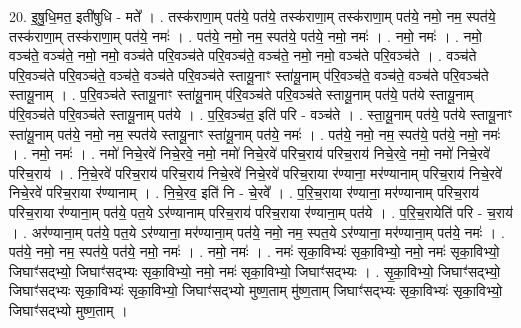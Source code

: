 \documentclass[17pt]{extarticle}
\begin{document}
20. इ॒षु॒धि॒मत॒ इती॑षुधि - मते᳚ । . तस्क॑राणा॒म् पत॑ये॒ पत॑ये॒ तस्क॑राणा॒म् तस्क॑राणा॒म् पत॑ये॒ नमो॒ नम॒ स्पत॑ये॒ तस्क॑राणा॒म् तस्क॑राणा॒म् पत॑ये॒ नमः॑ । . पत॑ये॒ नमो॒ नम॒ स्पत॑ये॒ पत॑ये॒ नमो॒ नमः॑ । . नमो॒ नमः॑ । . नमो॒ वञ्च॑ते॒ वञ्च॑ते॒ नमो॒ नमो॒ वञ्च॑ते परि॒वञ्च॑ते परि॒वञ्च॑ते॒ वञ्च॑ते॒ नमो॒ नमो॒ वञ्च॑ते परि॒वञ्च॑ते । . वञ्च॑ते परि॒वञ्च॑ते परि॒वञ्च॑ते॒ वञ्च॑ते॒ वञ्च॑ते परि॒वञ्च॑ते स्तायू॒नाꣳ स्ता॑यू॒नाम् प॑रि॒वञ्च॑ते॒ वञ्च॑ते॒ वञ्च॑ते परि॒वञ्च॑ते स्तायू॒नाम् । . प॒रि॒वञ्च॑ते स्तायू॒नाꣳ स्ता॑यू॒नाम् प॑रि॒वञ्च॑ते परि॒वञ्च॑ते स्तायू॒नाम् पत॑ये॒ पत॑ये स्तायू॒नाम् प॑रि॒वञ्च॑ते परि॒वञ्च॑ते स्तायू॒नाम् पत॑ये । . प॒रि॒वञ्च॑त॒ इति॑ परि - वञ्च॑ते । . स्ता॒यू॒नाम् पत॑ये॒ पत॑ये स्तायू॒नाꣳ स्ता॑यू॒नाम् पत॑ये॒ नमो॒ नम॒ स्पत॑ये स्तायू॒नाꣳ स्ता॑यू॒नाम् पत॑ये॒ नमः॑ । . पत॑ये॒ नमो॒ नम॒ स्पत॑ये॒ पत॑ये॒ नमो॒ नमः॑ । . नमो॒ नमः॑ । . नमो॑ निचे॒रवे॑ निचे॒रवे॒ नमो॒ नमो॑ निचे॒रवे॑ परिच॒राय॑ परिच॒राय॑ निचे॒रवे॒ नमो॒ नमो॑ निचे॒रवे॑ परिच॒राय॑ । . नि॒चे॒रवे॑ परिच॒राय॑ परिच॒राय॑ निचे॒रवे॑ निचे॒रवे॑ परिच॒राया र॑ण्याना॒ मर॑ण्यानाम् परिच॒राय॑ निचे॒रवे॑ निचे॒रवे॑ परिच॒राया र॑ण्यानाम् । . नि॒चे॒रव॒ इति॑ नि - चे॒रवे᳚ । . प॒रि॒च॒राया र॑ण्याना॒ मर॑ण्यानाम् परिच॒राय॑ परिच॒राया र॑ण्याना॒म् पत॑ये॒ पत॒ये ऽर॑ण्यानाम् परिच॒राय॑ परिच॒राया र॑ण्याना॒म् पत॑ये । . प॒रि॒च॒रायेति॑ परि - च॒राय॑ । . अर॑ण्याना॒म् पत॑ये॒ पत॒ये ऽर॑ण्याना॒ मर॑ण्याना॒म् पत॑ये॒ नमो॒ नम॒ स्पत॒ये ऽर॑ण्याना॒ मर॑ण्याना॒म् पत॑ये॒ नमः॑ । . पत॑ये॒ नमो॒ नम॒ स्पत॑ये॒ पत॑ये॒ नमो॒ नमः॑ । . नमो॒ नमः॑ । . नमः॑ सृका॒विभ्यः॑ सृका॒विभ्यो॒ नमो॒ नमः॑ सृका॒विभ्यो॒ जिघाꣳ॑सद्भ्यो॒ जिघाꣳ॑सद्भ्यः सृका॒विभ्यो॒ नमो॒ नमः॑ सृका॒विभ्यो॒ जिघाꣳ॑सद्भ्यः । . सृ॒का॒विभ्यो॒ जिघाꣳ॑सद्भ्यो॒ जिघाꣳ॑सद्भ्यः सृका॒विभ्यः॑ सृका॒विभ्यो॒ जिघाꣳ॑सद्भ्यो मुष्ण॒ताम् मु॑ष्ण॒ताम् जिघाꣳ॑सद्भ्यः सृका॒विभ्यः॑ सृका॒विभ्यो॒ जिघाꣳ॑सद्भ्यो मुष्ण॒ताम् । \newline
\end{document}
